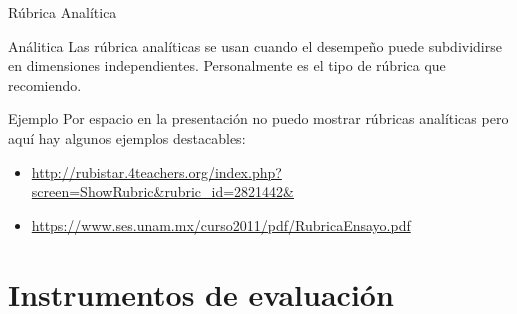 \documentclass[11pt, aspectratio=169, xcolor=table,hyphens]{beamer}
\begin{document}
\begin{frame}{Rúbrica Analítica}
	\begin{block}{Análitica}
		Las rúbrica analíticas se usan cuando el desempeño puede subdividirse en dimensiones independientes. Personalmente es el tipo de rúbrica que recomiendo.
	\end{block}
	\begin{exampleblock}{Ejemplo}
		Por espacio en la presentación no puedo mostrar rúbricas analíticas pero aquí hay algunos ejemplos destacables:
		\begin{itemize}
			\item \url{http://rubistar.4teachers.org/index.php?screen=ShowRubric&rubric_id=2821442&}
			\item \url{https://www.ses.unam.mx/curso2011/pdf/RubricaEnsayo.pdf}
		\end{itemize}
	\end{exampleblock}

\end{frame}

\section{Instrumentos de evaluación}
\end{document}
